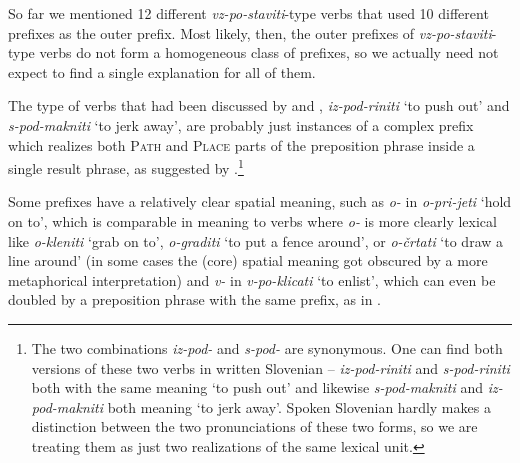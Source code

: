 \documentclass[output=paper,colorlinks,citecolor=brown]{langscibook}
\begin{document}
\begin{table}
    \caption{Lexical, superlexical, and other types of prefixes}
    \label{tab:LexAndSuperLexVzpostaviti}
\end{table}

So far we mentioned 12 different \textit{vz-po-staviti}-type verbs that used 10 different prefixes as the outer prefix. Most likely, then, the outer prefixes of \textit{vz-po-staviti}-type verbs do not form a homogeneous class of prefixes, so we actually need not expect to find a single explanation for all of them. 

The type of verbs that had been discussed by \citet{zaucer2002role} and \citet{svenonius2004slavic}, \textit{iz-pod-riniti} `to push out' and \textit{s-pod-makniti} `to jerk away', are probably just instances of a complex prefix which realizes both \textsc{Path} and \textsc{Place} parts of the preposition phrase inside a single result phrase, as suggested by \citet{svenonius2004slavic}.\footnote{The two combinations \textit{iz-pod-} and \textit{s-pod-} are synonymous. One can find both versions of these two verbs in written Slovenian -- \textit{iz-pod-riniti} and \textit{s-pod-riniti} both with the same meaning `to push out' and likewise \textit{s-pod-makniti} and \textit{iz-pod-makniti} both meaning `to jerk away'. Spoken Slovenian hardly makes a distinction between the two pronunciations of these two forms, so we are treating them as just two realizations of the same lexical unit.}

Some prefixes have a relatively clear spatial meaning, such as \textit{o-} in \textit{o-pri-jeti} `hold on to', which is comparable in meaning to verbs where \textit{o-} is more clearly lexical like \textit{o-kleniti} `grab on to', \textit{o-graditi} `to put a fence around', or \textit{o-črtati} `to draw a line around' (in some cases the (core) spatial meaning got obscured by a more metaphorical interpretation) and \textit{v-} in \textit{v-po-klicati} `to enlist', which can even be doubled by a preposition phrase with the same prefix, as in .
\end{document}
